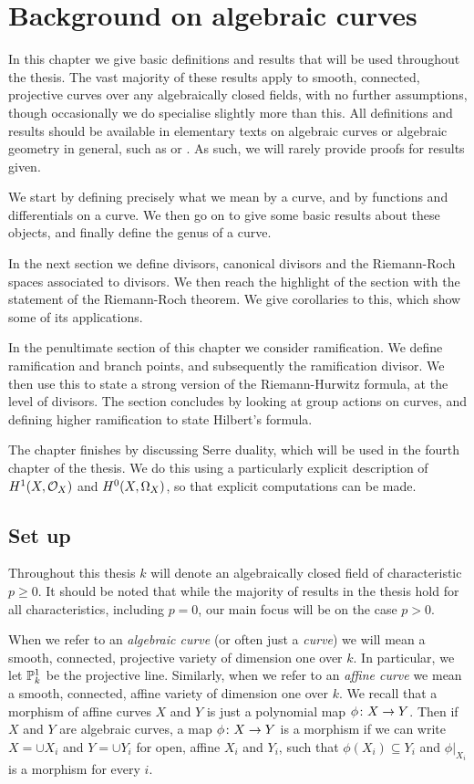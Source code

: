 \chapter{Background on algebraic curves}\label{chapterbackground}

In this chapter we give basic definitions and results that will be used throughout the thesis.
The vast majority of these results apply to smooth, connected, projective curves over any algebraically closed fields, with no further assumptions, though occasionally we do specialise slightly more than this.
All definitions and results should be available in elementary texts on algebraic curves or algebraic geometry in general, such as \cite{fulton} or \cite{hart} .
As such, we will rarely provide proofs for results given.

We start by defining precisely what we mean by a curve, and by functions and differentials on a curve.
We then go on to give some basic results about these objects, and finally define the genus of a curve.

In the next section we define divisors, canonical divisors and the Riemann-Roch spaces associated to divisors.
We then reach the highlight of the section with the statement of the Riemann-Roch theorem.
We give corollaries to this, which show some of its applications.

In the penultimate section of this chapter we consider ramification.
We define ramification and branch points, and subsequently the ramification divisor.
We then use this to state a strong version of the Riemann-Hurwitz formula, at the level of divisors.
The section concludes by looking at group actions on curves, and defining higher ramification to state Hilbert's formula.

The chapter finishes by discussing Serre duality, which will be used in the fourth chapter of the thesis.
We do this using a particularly explicit description of $H^1(X,\mathcal{O}_X)$ and ${H^0(X,\Omega_X)}$, so that explicit computations can be made.


\section{Set up}

Throughout this thesis $k$ will denote an algebraically closed field of characteristic $p \geq 0$.
It should be noted that while the majority of results in the thesis hold for all characteristics, including $p=0$, our main focus will be on the case $p > 0$.

When we refer to an \emph{algebraic curve} (or often just a \emph{curve}) we will mean a smooth, connected, projective variety of dimension one over $k$.
In particular, we let ${\mathbb P}_k^1$ be the projective line.
Similarly, when we refer to an \emph{affine curve} we mean a smooth, connected, affine variety of dimension one over $k$. %
We recall that a morphism of affine curves $X$ and $Y$ is just a polynomial map $\phi \colon X \rightarrow Y$.
Then if $X$ and $Y$ are algebraic curves, a map $\phi \colon X \rightarrow Y$ is a morphism if we can write $X = \cup X_i$ and $Y = \cup Y_i$ for open, affine $X_i$ and $Y_i$, such that $\phi(X_i) \subseteq Y_i$ and $\phi|_{X_i}$ is a morphism for every $i$.



